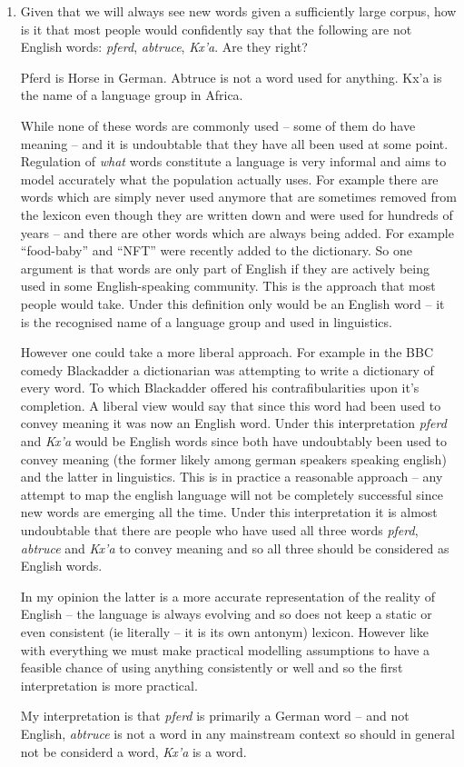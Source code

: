 \documentclass[10pt,\jkfside,a4paper]{article}
\begin{document}
\begin{enumerate}

\item Given that we will always see new words given a sufficiently large corpus,
how is it that most people would confidently say that the following are not
English words: \textit{pferd}, \textit{abtruce}, \textit{Kx'a}. Are they right?

Pferd is Horse in German.
Abtruce is not a word used for anything.
Kx'a is the name of a language group in Africa.

While none of these words are commonly used -- some of them do have meaning -- and it is 
undoubtable that they have all been used at some point. Regulation of \textit{what} words 
constitute a language is very informal and aims to model accurately what the population 
actually uses. For example there are words which are simply never used anymore that are 
sometimes removed from the lexicon even though they are written down and were used for hundreds 
of years -- and there are other words which are always being added. For example ``food-baby'' and 
``NFT'' were recently added to the dictionary. So one argument is that words are only part of 
English if they are actively being used in some English-speaking community. This is the approach 
that most people would take. Under this definition only  would be an English word -- 
it is the recognised name of a language group and used in linguistics.

However one could take a more liberal approach. For example in the BBC comedy Blackadder a 
dictionarian was attempting to write a dictionary of every word. To which Blackadder offered 
his contrafibularities upon it's completion. A liberal view would say that since this word 
had been used to convey meaning it was now an English word. Under this interpretation 
\textit{pferd} and \textit{Kx'a} would be English words since both have undoubtably been 
used to convey meaning (the former likely among german speakers speaking english) and the latter 
in linguistics. This is in practice a reasonable approach -- any attempt to map the english language 
will not be completely successful since new words are emerging all the time. Under this interpretation 
it is almost undoubtable that there are people who have used all three words \textit{pferd}, 
\textit{abtruce} and \textit{Kx'a} to convey meaning and so all three should be considered as 
English words.

In my opinion the latter is a more accurate representation of the reality of English -- the language 
is always evolving and so does not keep a static or even consistent (ie literally -- it is its 
own antonym) lexicon. However like with everything we must make practical modelling assumptions 
to have a feasible chance of using anything consistently or well and so the first interpretation 
is more practical.

My interpretation is that \textit{pferd} is primarily a German word -- and not English, \textit{abtruce} 
is not a word in any mainstream context so should in general not be considerd a word, \textit{Kx'a} is a word.

\end{enumerate}
\end{document}
